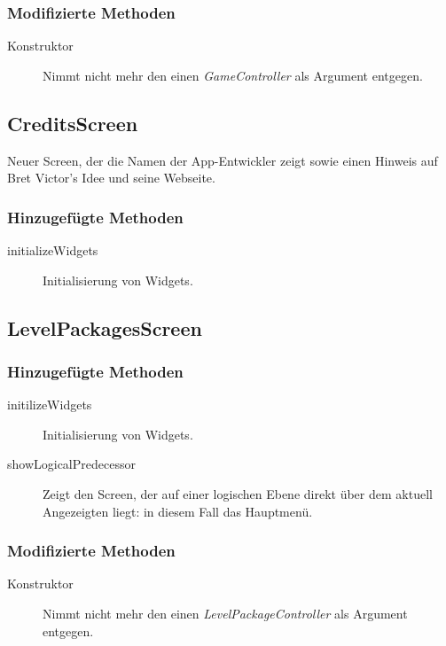 \subsubsection{Modifizierte Methoden}
\begin{description}
\item[Konstruktor]
Nimmt nicht mehr den einen \emph{GameController} als Argument entgegen.

\end{description}



\subsection{CreditsScreen}
Neuer Screen, der die Namen der App-Entwickler zeigt sowie einen Hinweis auf Bret Victor's Idee und seine Webseite.

\subsubsection{Hinzugefügte Methoden}
\begin{description}
\item[initializeWidgets]
Initialisierung von Widgets.

\end{description}



\subsection{LevelPackagesScreen}

\subsubsection{Hinzugefügte Methoden}
\begin{description}
\item[initilizeWidgets]
Initialisierung von Widgets.
\item[showLogicalPredecessor]
Zeigt den Screen, der auf einer logischen Ebene direkt über dem aktuell Angezeigten liegt: in diesem Fall das Hauptmenü.

\end{description}

\subsubsection{Modifizierte Methoden}
\begin{description}
\item[Konstruktor]
Nimmt nicht mehr den einen \emph{LevelPackageController} als Argument entgegen.

\end{description}


